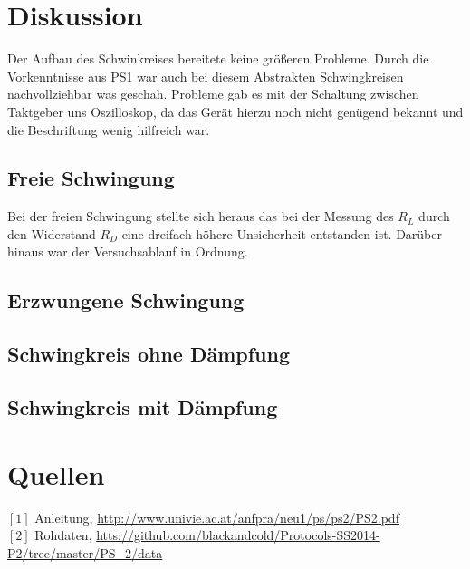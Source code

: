\documentclass[12pt,a4paper]{article}
\begin{document}
\begin{multicols}{2}


\pagebreak
\section{Diskussion}

Der Aufbau des Schwinkreises bereitete keine größeren Probleme. Durch die Vorkenntnisse aus PS1 war auch bei diesem Abstrakten Schwingkreisen nachvollziehbar was geschah. Probleme gab es mit der Schaltung zwischen Taktgeber uns Oszilloskop, da das Gerät hierzu noch nicht genügend bekannt und die Beschriftung wenig hilfreich war.

\subsection{Freie Schwingung}
Bei der freien Schwingung stellte sich heraus das bei der Messung des $R_L$ durch den Widerstand $R_D$ eine dreifach höhere Unsicherheit entstanden ist. Darüber hinaus war der Versuchsablauf in Ordnung. 

\subsection{Erzwungene Schwingung}
\subsection{Schwingkreis ohne Dämpfung}
\subsection{Schwingkreis mit Dämpfung}


\section{Quellen}
$[1]$ Anleitung, \url{http://www.univie.ac.at/anfpra/neu1/ps/ps2/PS2.pdf}\\
$[2]$ Rohdaten, \url{htts://github.com/blackandcold/Protocols-SS2014-P2/tree/master/PS_2/data}\\

\end{multicols}
\end{document}
